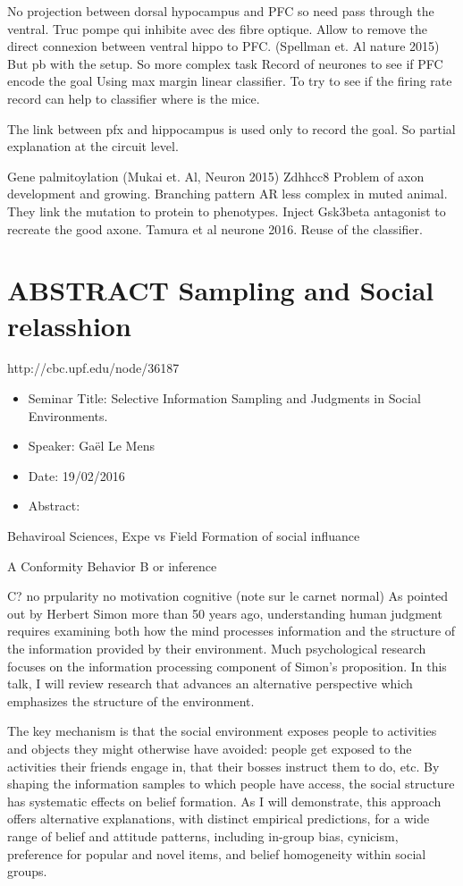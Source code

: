 \documentclass[10pt,letterpaper]{article}
\begin{document}
No projection between dorsal hypocampus and PFC so need pass through the ventral. Truc pompe qui inhibite avec des fibre optique.
Allow to remove the direct connexion between ventral hippo to PFC. (Spellman et. Al nature 2015)
But pb with the setup.
So more complex task
Record of neurones to see if PFC encode the goal
Using max margin linear classifier. To try to see if the firing rate record can help to classifier where is the mice.

The link between pfx and hippocampus is used only to record the goal. So partial explanation at the circuit level.

Gene palmitoylation (Mukai et. Al, Neuron 2015)
Zdhhcc8
Problem of axon development and growing. Branching pattern AR less complex in muted animal. They link the mutation to protein to phenotypes.
Inject Gsk3beta antagonist to recreate the good axone. Tamura et al neurone 2016.
Reuse of the classifier. 


\section{ABSTRACT Sampling and Social relasshion}
http://cbc.upf.edu/node/36187
\begin{itemize}
    \item Seminar Title: Selective Information Sampling and Judgments in Social Environments.
    \item Speaker: Gaël Le Mens
    \item Date: 19/02/2016
    \item Abstract:
\end{itemize}
Behaviroal Sciences, Expe vs Field
Formation of social influance

A Conformity Behavior
B or inference

C? no prpularity no motivation cognitive
(note sur le carnet normal)
As pointed out by Herbert Simon more than 50 years ago, understanding human judgment requires examining both how the mind processes information and the structure of the information provided by their environment. Much psychological research focuses on the information processing component of Simon’s proposition. In this talk, I will review research that advances an alternative perspective which emphasizes the structure of the environment. 

The key mechanism is that the social environment exposes people to activities and objects they might otherwise have avoided: people get exposed to the activities their friends engage in, that their bosses instruct them to do, etc. By shaping the information samples to which people have access, the social structure has systematic effects on belief formation. As I will demonstrate, this approach offers alternative explanations, with distinct empirical predictions, for a wide range of belief and attitude patterns, including in-group bias, cynicism, preference for popular and novel items, and belief homogeneity within social groups. 
\end{document}
